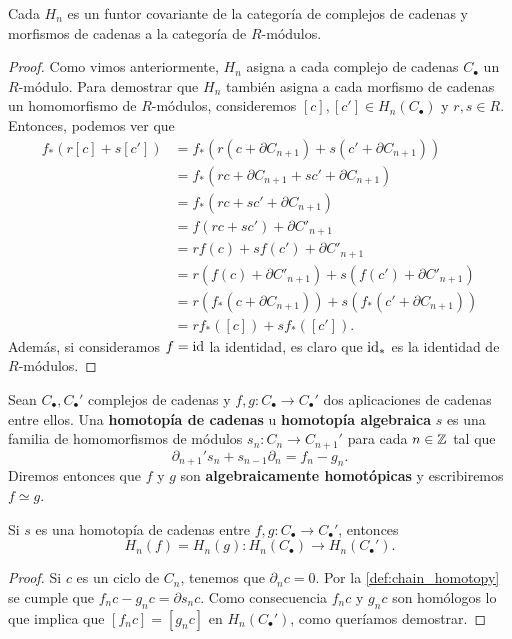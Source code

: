 \begin{proposicion}
	Cada \(H_{n}\) es un funtor covariante de la categoría de complejos de cadenas y
	morfismos de cadenas a la categoría de \(R\)-módulos.
\end{proposicion}
\begin{proof}
	Como vimos anteriormente, \(H_{n}\) asigna a cada complejo de cadenas
	\(C_{\bullet}\) un \(R\)-módulo. Para demostrar que \(H_{n}\) también asigna a cada morfismo
	de cadenas un homomorfismo de \(R\)-módulos, consideremos
	\([c], [c'] \in H_{n}(C_{\bullet})\) y \(r, s \in R\). Entonces, podemos ver que
	\begin{align}
		f_{*}(r[c] + s[c']) & = f_{*}(r(c + \partial C_{n+1}) + s(c' + \partial C_{n+1}))        \\
		& = f_{*}(rc + \partial C_{n+1}+ sc' + \partial C_{n+1})             \\
		& = f_{*}(rc + sc' + \partial C_{n+1})                               \\
		& = f(rc + sc') + \partial C'_{n+1}                                  \\
		& = rf(c) + sf(c') + \partial C'_{n+1}                               \\
		& = r(f(c) + \partial C'_{n+1}) + s(f(c') + \partial C'_{n+1})       \\
		& = r(f_{*}(c + \partial C_{n+1})) + s(f_{*}(c' + \partial C_{n+1})) \\
		& = rf_{*}([c]) + sf_{*}([c']).
	\end{align}
	Además, si consideramos \(f = \operatorname{id}\) la identidad, es claro que \(\operatorname{id}_{*}\) es la
	identidad de \(R\)-módulos.
\end{proof}

\begin{definicion}
	\label{def:chain_homotopy} Sean \(C_{\bullet},C_{\bullet}'\) complejos de cadenas
	y \(f,g: C_{\bullet}\rightarrow C_{\bullet}'\) dos aplicaciones de cadenas entre
	ellos. Una \textbf{homotopía de cadenas} u \textbf{homotopía algebraica} \(s\)
	es una familia de homomorfismos de módulos \(s_{n}: C_{n}\rightarrow C_{n+1}'\)
	para cada \(n \in \mathbb{Z}\) tal que
	\begin{equation}
		\partial_{n+1}'s_{n}+ s_{n-1}\partial_{n}= f_{n}- g_{n}.
	\end{equation}
	Diremos entonces que \(f\) y \(g\) son \textbf{algebraicamente homotópicas} y escribiremos
	\(f \simeq g\).
\end{definicion}

\begin{teorema}
	\label{teo:homot-cad-misma-homologia} Si \(s\) es una homotopía de cadenas entre
	\(f,g: C_{\bullet}\rightarrow C_{\bullet}'\), entonces
	\[
	H_{n}(f) = H_{n}(g) : H_{n}(C_{\bullet}) \rightarrow H_{n}(C_{\bullet}').
	\]
\end{teorema}
\begin{proof}
	Si \(c\) es un ciclo de \(C_{n}\), tenemos que \(\partial_{n}c = 0\). Por la \autoref{def:chain_homotopy}
	se cumple que \(f_{n}c-g_{n}c = \partial s_{n}c\). Como consecuencia \(f_{n}c\) y
	\(g_{n}c\) son homólogos lo que implica que \([f_{n}c] = [g_{n}c]\) en
	\(H_{n}(C_{\bullet}')\), como queríamos demostrar.
\end{proof}

